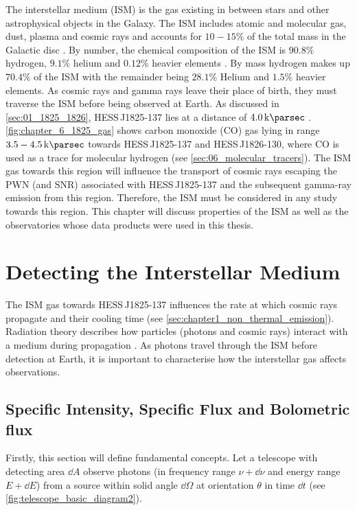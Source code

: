The interstellar medium (ISM) is the gas existing in between stars and other astrophysical objects in the Galaxy. The ISM includes atomic and molecular gas, dust, plasma and cosmic rays and accounts for $10-15\%$ of the total mass in the Galactic disc \citep{2001RvMP...73.1031F}. By number, the chemical composition of the ISM is $90.8\%$ hydrogen, $9.1\%$ helium and $0.12\%$ heavier elements \citep{2001RvMP...73.1031F}. By mass hydrogen makes up $70.4\%$ of the ISM with the remainder being $28.1\%$ Helium and $1.5\%$ heavier elements. As cosmic rays and gamma rays leave their place of birth, they must traverse the ISM before being observed at Earth.
\newpar 
As discussed in \autoref{sec:01_1825_1826}, \mbox{HESS\,J1825-137} lies at a distance of $4.0\,\kpc$  \citep{2006A&A...460..365A}. \autoref{fig:chapter_6_1825_gas} shows carbon monoxide (CO) gas lying in range $3.5-4.5\,\kpc$ towards \mbox{HESS\,J1825-137} and \mbox{HESS\,J1826-130}, where CO is used as a trace for molecular hydrogen (see \autoref{sec:06_molecular_tracers}). The ISM gas towards this region will influence the transport of cosmic rays escaping the PWN (and SNR) associated with \mbox{HESS\,J1825-137} and the subsequent gamma-ray emission from this region. Therefore, the ISM must be considered in any study towards this region. This chapter will discuss properties of the ISM as well as the observatories whose data products were used in this thesis.
\newpage  %
\section{Detecting the Interstellar Medium}

The ISM gas towards \mbox{HESS\,J1825-137} influences the rate at which cosmic rays propagate and their cooling time (see \autoref{sec:chapter1_non_thermal_emission}). Radiation theory describes how particles (photons and cosmic rays) interact with a medium during propagation \citep{2011piim.book.....D}. As photons travel through the ISM before detection at Earth, it is important to characterise how the interstellar gas affects observations.

\subsection{Specific Intensity, Specific Flux and Bolometric flux}

Firstly, this section will define fundamental concepts.
\newpar 
\noindent Let a telescope with detecting area $\dd{A}$ observe photons (in frequency range $\nu + \dd{\nu}$ and energy range $E+\dd{E}$) from a source within solid angle $\dd{\Omega}$ at orientation $\theta$ in time $\dd{t}$ (see \autoref{fig:telescope_basic_diagram2}).

